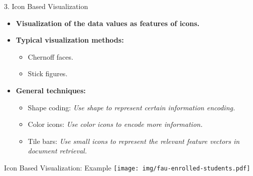 \begin{frame}{3. Icon Based Visualization}
  \centering
  \begin{itemize}
  \item \textbf{Visualization of the data values as features of icons.}
  \item \textbf{Typical visualization methods:}
    \begin{itemize}
    \item Chernoff faces.
    \item Stick figures.
    \end{itemize}
  \item \textbf{General techniques:}
    \begin{itemize}
    \item Shape coding: \emph{Use shape to represent certain information encoding.}
    \item Color icons: \emph{Use color icons to encode more information.}
    \item Tile bars: \emph{Use small icons to represent the relevant feature vectors in document retrieval.}
    \end{itemize}
  \end{itemize}
\end{frame}


\begin{frame}{Icon Based Visualization: Example}
  \centering
  \texttt{[image: img/fau-enrolled-students.pdf]}
\end{frame}

